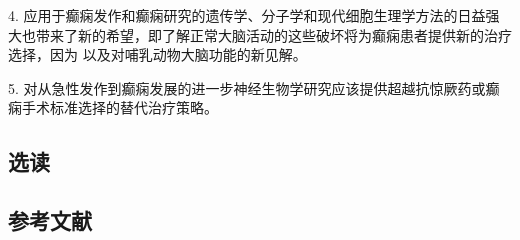4. 应用于癫痫发作和癫痫研究的遗传学、分子学和现代细胞生理学方法的日益强大也带来了新的希望，即了解正常大脑活动的这些破坏将为癫痫患者提供新的治疗选择，因为 以及对哺乳动物大脑功能的新见解。 

5. 对从急性发作到癫痫发展的进一步神经生物学研究应该提供超越抗惊厥药或癫痫手术标准选择的替代治疗策略。

\subsection{选读}
\subsection{参考文献}
